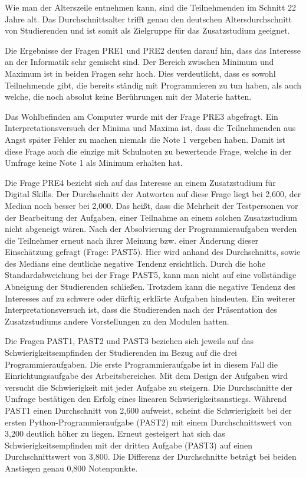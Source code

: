 Wie man der Alterszeile entnehmen kann, sind die Teilnehmenden im Schnitt 22
Jahre alt. Das Durchschnittsalter trifft genau den deutschen Altersdurchschnitt
von Studierenden und ist somit als Zielgruppe für das Zusatzstudium geeignet.
\parencite{studie-alter-studierenden}

Die Ergebnisse der Fragen PRE1 und PRE2 deuten darauf hin, dass das Interesse
an der Informatik sehr gemischt sind. Der Bereich zwischen Minimum und Maximum
ist in beiden Fragen sehr hoch. Dies verdeutlicht, dass es sowohl Teilnehmende
gibt, die bereits ständig mit Programmieren zu tun haben, als auch welche, die
noch absolut keine Berührungen mit der Materie hatten.

Das Wohlbefinden am Computer wurde mit der Frage PRE3 abgefragt. Ein
Interpretationsversuch der Minima und Maxima ist, dass die Teilnehmenden aus
Angst später Fehler zu machen niemals die Note 1 vergeben haben. Damit ist diese
Frage auch die einzige mit Schulnoten zu bewertende Frage, welche in der Umfrage
keine Note 1 als Minimum erhalten hat.

Die Frage PRE4 bezieht sich auf das Interesse an einem Zusatzstudium für
Digital Skills. Der Durchschnitt der Antworten auf diese Frage liegt bei 2,600,
der Median noch besser bei 2,000. Das heißt, dass die Mehrheit der Testpersonen
vor der Bearbeitung der Aufgaben, einer Teilnahme an einem solchen Zusatzstudium
nicht abgeneigt wären. Nach der Absolvierung der Programmieraufgaben werden die 
Teilnehmer erneut nach ihrer Meinung bzw. einer Änderung dieser Einschätzung
gefragt (Frage: PAST5). Hier wird anhand des Durchschnitts, sowie des Medians
eine deutliche negative Tendenz ersichtlich. Durch die hohe Standardabweichung
bei der Frage PAST5, kann man nicht auf eine vollständige Abneigung der
Studierenden schließen. Trotzdem kann die negative Tendenz des Interesses auf zu
schwere oder dürftig erklärte Aufgaben hindeuten. Ein weiterer
Interpretationsversuch ist, dass die Studierenden nach der Präsentation des 
Zusatzstudiums andere Vorstellungen zu den Modulen hatten.

Die Fragen PAST1, PAST2 und PAST3 beziehen sich jeweils auf das
Schwierigkeitsempfinden der Studierenden im Bezug auf die drei
Programmieraufgaben. Die erste Programmieraufgabe ist in diesem Fall die
Einrichtungsaufgabe des Arbeitsbereiches. Mit dem Design der Aufgaben wird
versucht die Schwierigkeit mit jeder Aufgabe zu steigern. Die Durchschnitte der
Umfrage bestätigen den Erfolg eines linearen Schwierigkeitsanstiegs. Während
PAST1 einen Durchschnitt von 2,600 aufweist, scheint die Schwierigkeit bei der
ersten Python-Programmieraufgabe (PAST2) mit einem Durchschnittswert von 3,200
deutlich höher zu liegen. Erneut gesteigert hat sich das Schwierigkeitsempfinden
mit der dritten Aufgabe (PAST3) auf einen Durchschnittswert von 3,800. Die
Differenz der Durchschnitte beträgt bei beiden Anstiegen genau 0,800
Notenpunkte.


